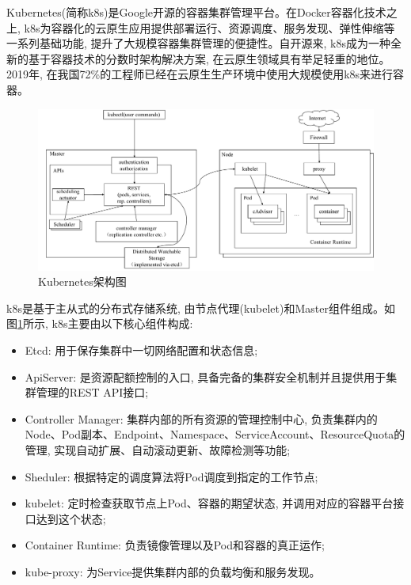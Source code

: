 Kubernetes(简称k8s)是Google开源的容器集群管理平台。在Docker容器化技术之上, k8s为容器化的云原生应用提供部署运行、资源调度、服务发现、弹性伸缩等一系列基础功能, 提升了大规模容器集群管理的便捷性。自开源来, k8s成为一种全新的基于容器技术的分数时架构解决方案, 在云原生领域具有举足轻重的地位。2019年, 在我国72\%的工程师已经在云原生生产环境中使用大规模使用k8s来进行容器\footnotemark[1]。

\begin{figure}[h] %
    \centering %
    \includegraphics[width=1.0\textwidth]{FIGs/chapter2/k8s.pdf} %
    \caption{Kubernetes架构图} %
    \label{k8s} %
\end{figure}%

k8s是基于主从式的分布式存储系统, 由节点代理(kubelet)和Master组件组成。如图\ref{k8s}所示, k8s主要由以下核心组件构成:

\begin{itemize}[itemindent=2em]
    \item Etcd: 用于保存集群中一切网络配置和状态信息;

    \item ApiServer: 是资源配额控制的入口, 具备完备的集群安全机制并且提供用于集群管理的REST API接口;

    \item Controller Manager: 集群内部的所有资源的管理控制中心, 负责集群内的Node、Pod副本、Endpoint、Namespace、ServiceAccount、ResourceQuota的管理, 实现自动扩展、自动滚动更新、故障检测等功能;

    \item Sheduler: 根据特定的调度算法将Pod调度到指定的工作节点;

    \item kubelet: 定时检查获取节点上Pod、容器的期望状态, 并调用对应的容器平台接口达到这个状态;

    \item Container Runtime: 负责镜像管理以及Pod和容器的真正运作\cite{wangjunxiang2018};

    \item kube-proxy: 为Service提供集群内部的负载均衡和服务发现。
\end{itemize}

